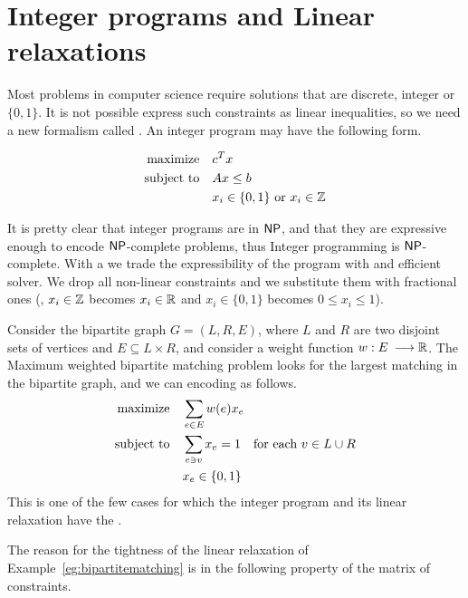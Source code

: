 \documentclass[a4paper,twoside,justified]{tufte-handout}
\begin{document}
\section{Integer programs and Linear relaxations}

Most problems in computer science require solutions that are discrete,
integer or $ \{0,1\} $. It is not possible express such constraints as
linear inequalities, so we need a new formalism called
. An integer program may have the
following form.

\begin{alignat*}{2}
  \text{maximize}\hspace{1em}&  c^{T}x\\
  \text{subject to}\hspace{1em}& Ax \leq b\\
  & x_{i}\in\{0,1\}\text{\ or\ }x_{i}\in\mathbb{Z} 
\end{alignat*}

It is pretty clear that integer programs are in $ \mathsf{NP} $, and that they
are expressive enough to encode $\mathsf{NP}$-complete problems, thus Integer
programming is $\mathsf{NP}$-complete.
%
With a  we trade the expressibility
of the program with and efficient solver. We drop all non-linear
constraints and we substitute them with fractional ones (\eg, $
x_{i}\in \mathbb{Z} $ becomes $ x_{i}\in\mathbb{R} $ and $ x_{i} \in\{0,1\} $
becomes $ 0\leq x_{i}\leq 1 $).

\begin{example}%
  \label{eg:bipartitematching}
  Consider the bipartite graph $G=(L,R,E)$, where $L$ and $R$ are two
  disjoint sets of vertices and $ E\subseteq L\times R $, and consider
  a weight function $w:E\:\longrightarrow \mathbb{R} $.  The Maximum
  weighted bipartite matching problem looks for the largest matching
  in the bipartite graph, and we can encoding as follows.
  \begin{alignat*}{3}
    \text{maximize}\hspace{1em}& \sum_{e\in E} w(e) x_{e}\\
    \text{subject to}\hspace{1em}& \sum_{e \ni v} x_{e} =1 \quad \text{for each $v\in L\cup R$}\\
    & x_{e} \in\{0,1\}
  \end{alignat*}
  This is one of the few cases for which the integer program and its linear
  relaxation have the .
\end{example}

The reason for the tightness of the linear relaxation of
Example~\ref{eg:bipartitematching} is in the following property of the
matrix of constraints.
\end{document}
